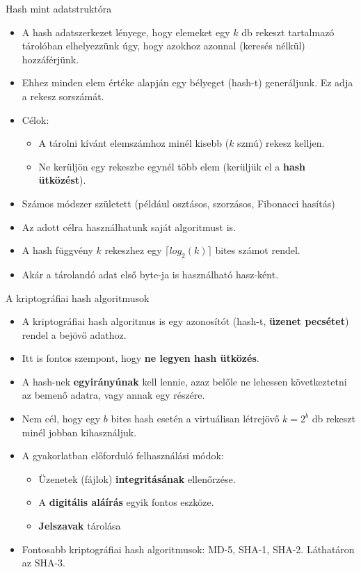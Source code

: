 \documentclass[12 pt]{beamer}
\begin{document}
\begin{frame}{Hash mint adatstruktóra}
    \begin{itemize}
      \item{A hash adatszerkezet lényege, hogy elemeket egy $k$ db rekeszt tartalmazó tárolóban elhelyezzünk úgy, hogy azokhoz azonnal (keresés nélkül) hozzáférjünk.}
      \item{Ehhez minden elem értéke alapján egy bélyeget (hash-t) generáljunk. Ez adja a rekesz sorszámát.}
      \item{Célok:}
        \begin{itemize}
          \item{A tárolni kívánt elemszámhoz minél kisebb ($k$ szmú) rekesz kelljen.}
          \item{Ne kerüljön egy rekeszbe egynél több elem (kerüljük el a \textbf{hash ütközést}).}
        \end{itemize}
      \item{Számos módszer született (például osztásos, szorzásos, Fibonacci hasítás)}
      \item{Az adott célra használhatunk saját algoritmust is.}
      \item{A hash függvény $k$ rekeszhez egy $\lceil log_{2}(k) \rceil$ bites számot rendel.}
      \item{Akár a tárolandó adat első byte-ja is használható hasz-ként.}
    \end{itemize}
\end{frame}

\begin{frame}{A kriptográfiai hash algoritmusok}
  \begin{itemize}
    \item{A kriptográfiai hash algoritmus is egy azonosítót (hash-t, \textbf{üzenet pecsétet}) rendel a bejövő adathoz.}
    \item{Itt is fontos szempont, hogy \textbf{ne legyen hash ütközés}.}
    \item{A hash-nek \textbf{egyirányúnak} kell lennie, azaz belőle ne lehessen következtetni az bemenő adatra, vagy annak egy részére.}
    \item{Nem cél, hogy egy $b$ bites hash esetén a virtuálisan létrejövő $k = 2^b$ db rekeszt minél jobban kihasználjuk.}
    \item{A gyakorlatban előforduló felhasználási módok:}
      \begin{itemize}
        \item{Üzenetek (fájlok) \textbf{integritásának} ellenőrzése.}
        \item{A \textbf{digitális aláírás} egyik fontos eszköze.}
        \item{\textbf{Jelszavak} tárolása}
      \end{itemize}
    \item{Fontosabb kriptográfiai hash algoritmusok: MD-5, SHA-1, SHA-2. Láthatáron az SHA-3.}
  \end{itemize}
\end{frame}
\end{document}

